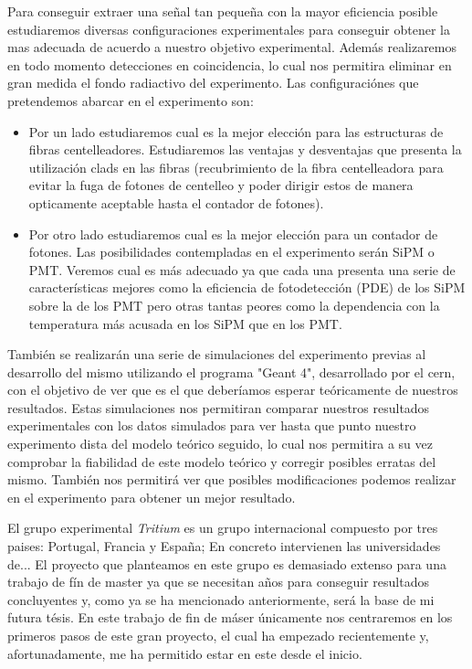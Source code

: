 Para conseguir extraer una señal tan pequeña con la mayor eficiencia posible estudiaremos diversas configuraciones experimentales para conseguir obtener la mas adecuada de acuerdo a nuestro objetivo experimental. Además realizaremos en todo momento detecciones en coincidencia, lo cual nos permitira eliminar en gran medida el fondo radiactivo del experimento. Las configuraciónes que pretendemos abarcar en el experimento son: 
\begin{itemize}
\item {}
Por un lado estudiaremos cual es la mejor elección para las estructuras de fibras centelleadores. Estudiaremos las ventajas y desventajas que presenta la utilización clads en las fibras (recubrimiento de la fibra centelleadora para evitar la fuga de fotones de centelleo y poder dirigir estos de manera opticamente aceptable hasta el contador de fotones). 
\item {}
Por otro lado estudiaremos cual es la mejor elección para un contador de fotones. Las posibilidades contempladas en el experimento serán SiPM o PMT. Veremos cual es más adecuado ya que cada una presenta una serie de características mejores como la eficiencia de fotodetección (PDE) de los SiPM sobre la de los PMT pero otras tantas peores como la dependencia con la temperatura más acusada en los SiPM que en los PMT.
\end{itemize}

También se realizarán una serie de simulaciones del experimento previas al desarrollo del mismo utilizando el programa "Geant 4", desarrollado por el cern, con el objetivo de ver que es el que deberíamos esperar teóricamente de nuestros resultados. Estas simulaciones nos permitiran comparar nuestros resultados experimentales con los datos simulados para ver hasta que punto nuestro experimento dista del modelo teórico seguido, lo cual nos permitira a su vez comprobar la fiabilidad de este modelo teórico y corregir posibles erratas del mismo. También nos permitirá ver que posibles modificaciones podemos realizar en el experimento para obtener un mejor resultado.

El grupo experimental \textit{Tritium} es un grupo internacional compuesto por tres paises: Portugal, Francia y España; En concreto intervienen las universidades de...  El proyecto que planteamos en este grupo es demasiado extenso para una trabajo de fín de master ya que se necesitan años para conseguir resultados concluyentes y, como ya se ha mencionado anteriormente, será la base de mi futura tésis. En este trabajo de fin de máser únicamente nos centraremos en los primeros pasos de este gran proyecto, el cual ha empezado recientemente y, afortunadamente, me ha permitido estar en este desde el inicio.

